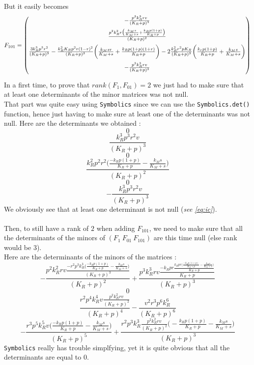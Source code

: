 \documentclass{tudelft-report}
\begin{document}
But it easily becomes 
$$F_{101} = 
\begin{pmatrix}
 \vspace{0.2cm}
 -\frac{p^3k_R^3rv}{(K_R+p)^3}\\
  \vspace{0.2cm}
 \frac{p^2k_R^2r\big(\frac{k_Ms}{K_M+s} + \frac{k_Rp(1+p)}{K_R+p}\big)}{(K_R+p)^2}\\
  \vspace{0.2cm}
 \frac{3k_R^3p^3r^2}{(K_R+p)^3}-\frac{k_R^2K_Rp^2r(1-r)^2}{(K_R+p)^3}\bigg(\frac{k_Msr}{K_M+s}+\frac{k_Rp(1+p)(1+r)}{K_R+p}\bigg)-2\frac{k_R^2r^2pK_R}{(K_R+p)^3}\bigg(\frac{k_rp(1+p)}{K_R+p}+\frac{k_Ms}{K_M+s}\bigg) \\
  \vspace{0.2cm}
 -\frac{p^3k_R^3rv}{(K_R+p)^3}
\end{pmatrix}
$$
In a first time, to prove that $rank(F_1, F_{01}) = 2$ we just had to make sure that at least one determinants of the minor matrices was not null.\\
That part was quite easy using \verb|Symbolics| since we can use the \verb|Symbolics.det()| function, hence just having to make sure at least one of the determinants was not null. Here are the determinants we obtained : 
$$0$$
$$\frac{k_R^3p^3r^2v}{(K_R+p)^3}$$
$$0 $$
$$ \frac{k_R^2p^2r^2\big(\frac{-k_Rp(1+p)}{K_R+p} - \frac{k_Ms}{K_M+s}\big)}{(K_R+p)^2}$$ 
$$ 0$$
$$ -\frac{k_R^3p^3r^2v}{(K_R+p)^3}$$ 
We obviously see that at least one determinant is not null (\emph{see \eqref{eq:ic}}). \\
\\
Then, to still have a rank of $2$ when adding $F_{101}$, we need to make sure that all the determinants of the minors of $(F_1\ F_{01}\ F_{101})$ are this time null (else rank would be $3$). \\
Here are the determinants of the minors of the matrices : 
$$-\frac{p^2k_R^2rv\frac{-r^2p^3k_R^3\big(\frac{-k_Rp(1+p)}{K_R+p}-\frac{k_Ms}{K_M+s}\big)}{(K_R+p)^3}}{(K_R+p)^2} + \frac{p^3k_R^3rv\frac{-k_Rpr\frac{k_Rpr\big(\frac{-k_Rp(1+p)}{K_R+p}-\frac{k_Ms}{K_M+s}\big)}{K_R+p}}{K_R+p}}{(K_R+p)^3}$$ 
$$ 0$$
$$ \frac{r^2p^4k_R^4v\frac{p^2k_R^2rv}{(K_R+p)^2}}{(K_R+p)^4} - \frac{v^2r^3p^6k_R^6}{(K_R+p)^6}$$
$$ -\frac{r^3p^5k_R^5v\big(\frac{-k_Rp(1+p)}{K_R+p}-\frac{k_Ms}{K_M+s}\big)}{(K_R+p)^5} + \frac{r^2p^3k_R^3\frac{p^2k_R^2rv}{(K_R+p)^2}\big(-\frac{k_Rp(1+p)}{K_R+p} - \frac{k_Ms}{K_M+s}\big)}{(K_R+p)^3}$$
\verb|Symbolics| really has trouble simplfying, yet it is quite obvious that all the determinants are equal to $0$.\\
\end{document}
